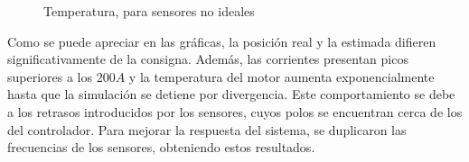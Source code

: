 \documentclass[a4paper, 10pt, onecolumn,journal]{ieeeconf}
\begin{document}
\begin{figure}[H]
	\centering
	\begin{adjustbox}{max width=\columnwidth}
	\end{adjustbox}
	\caption{Temperatura, para sensores no ideales}
	\label{Temperatura, para sensores no ideales}
\end{figure}

Como se puede apreciar en las gráficas, la posición real y la estimada difieren significativamente de la consigna. Además, las corrientes presentan picos superiores a los $200 A$ y la temperatura del motor aumenta exponencialmente hasta que la simulación se detiene por divergencia. Este comportamiento se debe a los retrasos introducidos por los sensores, cuyos polos se encuentran cerca de los del controlador. Para mejorar la respuesta del sistema, se duplicaron las frecuencias de los sensores, obteniendo estos resultados.
\end{document}
